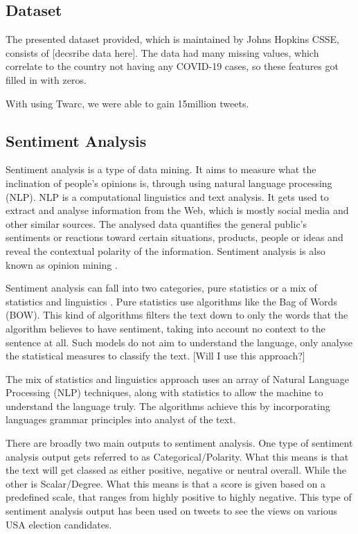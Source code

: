 \documentclass[a4paper,10pt]{article}
\begin{document}
\subsection{Dataset}
The presented dataset provided, which is maintained by Johns Hopkins CSSE, consists of [decsribe data here]. The data had many missing values, which correlate to the country not having any COVID-19 cases, so these features got filled in with zeros.

With using Twarc, we were able to gain 15million tweets.

\subsection{Sentiment Analysis}
Sentiment analysis is a type of data mining. It aims to measure what the inclination of people's opinions is, through using natural language processing (NLP). NLP is a computational linguistics and text analysis. It gets used to extract and analyse information from the Web, which is mostly social media and other similar sources. The analysed data quantifies the general public's sentiments or reactions toward certain situations, products, people or ideas and reveal the contextual polarity of the information. Sentiment analysis is also known as opinion mining \cite{towarddatasciencesentiment}.

Sentiment analysis can fall into two categories, pure statistics or a mix of statistics and linguistics \cite{towarddatasciencesentiment}. Pure statistics use algorithms like the Bag of Words (BOW). This kind of algorithms filters the text down to only the words that the algorithm believes to have sentiment, taking into account no context to the sentence at all. Such models do not aim to understand the language, only analyse the statistical measures to classify the text. [Will I use this approach?] 

The mix of statistics and linguistics approach uses an array of Natural Language Processing (NLP) techniques, along with statistics to allow the machine to understand the language truly. The algorithms achieve this by incorporating languages grammar principles into analyst of the text. 

There are broadly two main outputs to sentiment analysis. One type of sentiment analysis output gets referred to as Categorical/Polarity. What this means is that the text will get classed as either positive, negative or neutral overall. While the other is Scalar/Degree. What this means is that a score is given based on a predefined scale, that ranges from highly positive to highly negative. This type of sentiment analysis output has been used on tweets to see the views on various USA election candidates.
\end{document}
